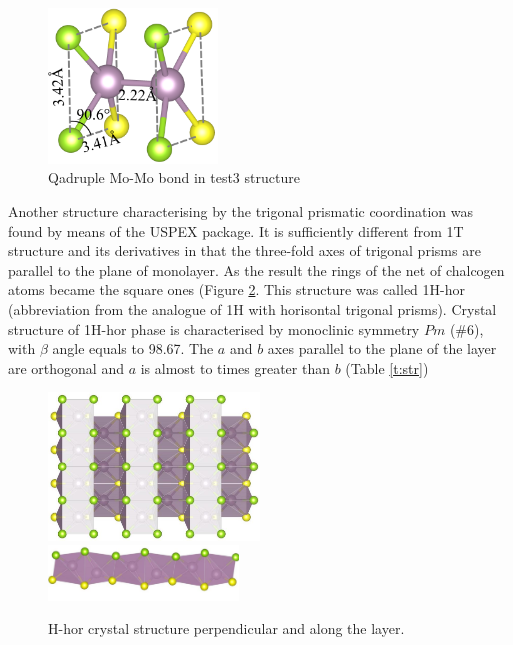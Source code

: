 \documentclass[a4paperm]{article}
\begin{document}
\begin{figure}
	\includegraphics[width=0.4\textwidth]{test3_momo.png}
	\caption{Qadruple Mo-Mo bond in test3 structure}
\label{test3_momo}
\end{figure}



Another structure characterising by the trigonal prismatic coordination was found by means of the USPEX package.
It is sufficiently different from 1T structure and its derivatives in that the three-fold axes of trigonal prisms are parallel to the plane of monolayer.
As the result the rings of the net of chalcogen atoms became the square ones (Figure \ref{H_hor}.
This structure was called 1H-hor (abbreviation from the analogue of 1H with horisontal trigonal prisms).
Crystal structure of 1H-hor phase is characterised by monoclinic symmetry $Pm$ (\#6), with $\beta$ angle equals to 98.67\textdegree.
The $a$ and $b$ axes parallel to the plane of the layer are orthogonal and $a$ is almost to times greater than $b$ (Table \ref{t:str})

\begin{figure}[H]
	\includegraphics[width=0.5\textwidth]{H_hor_1.jpg} \\
	\includegraphics[width=0.45\textwidth]{H_hor_2.jpg}
	\caption{H-hor crystal structure perpendicular and along the layer.}
\label{H_hor}
\end{figure} 
\end{document}
